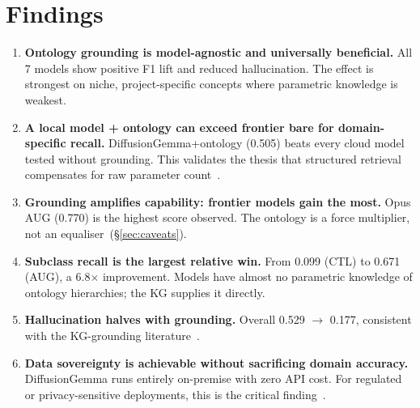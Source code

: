 \documentclass[11pt]{article}
\begin{document}
\section{Findings}
\begin{samepage}
\begin{enumerate}[leftmargin=1.3em]
\item \textbf{Ontology grounding is model-agnostic and universally beneficial.} All 7 models
      show positive F1 lift and reduced hallucination. The effect is strongest on niche,
      project-specific concepts where parametric knowledge is weakest.

\item \textbf{A local model + ontology can exceed frontier bare for domain-specific recall.}
      DiffusionGemma+ontology (0.505) beats every cloud model tested without grounding. This
      validates the thesis that structured retrieval compensates for raw parameter
      count~\cite{lewis2020rag,liu2024chatqa}.

\item \textbf{Grounding amplifies capability: frontier models gain the most.} Opus AUG (0.770)
      is the highest score observed. The ontology is a force multiplier, not an
      equaliser~(\S\ref{sec:caveats}).

\item \textbf{Subclass recall is the largest relative win.} From 0.099 (CTL) to 0.671 (AUG), a
      6.8$\times$ improvement. Models have almost no parametric knowledge of ontology hierarchies;
      the KG supplies it directly.

\item \textbf{Hallucination halves with grounding.} Overall 0.529 $\to$ 0.177, consistent with
      the KG-grounding literature~\cite{agrawal2023kghallucination,sansford2024kgtrustworthy}.

\item \textbf{Data sovereignty is achievable without sacrificing domain accuracy.}
      DiffusionGemma runs entirely on-premise with zero API cost. For regulated or
      privacy-sensitive deployments, this is the critical
      finding~\cite{advisori2026gdpr}.
\end{enumerate}
\end{samepage}

\end{document}

